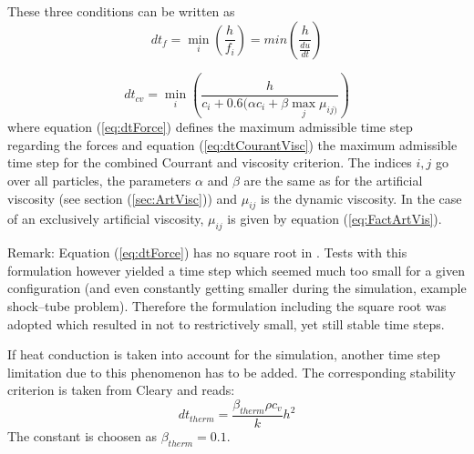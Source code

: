 \documentclass{report}
\begin{document}
These three conditions can be written as \cite{Monaghan1989,Monaghan1992}
\begin{equation}
\label{eq:dtForce}
 dt_f=\min_i\left(\frac{h}{f_i}\right)=min\left(\frac{h}{\frac{du}{dt}}\right)
\end{equation}

\begin{equation}
\label{eq:dtCourantVisc}
 dt_{cv}=\min_i\left(\frac{h}{c_i+0.6(\alpha c_i+\beta \max_j \mu_{ij)}}\right)
\end{equation}
where equation (\ref{eq:dtForce}) defines the maximum admissible time step regarding the forces and equation (\ref{eq:dtCourantVisc}) the maximum admissible time step for the combined Courrant and viscosity criterion. The indices $i,j$ go over all particles, the parameters $\alpha$ and $\beta$ are the same as for the artificial viscosity (see section (\ref{sec:ArtVisc})) and $\mu_{ij}$ is the dynamic viscosity. In the case of an exclusively artificial viscosity, $\mu_{ij}$ is given by equation (\ref{eq:FactArtVis}).

Remark: Equation (\ref{eq:dtForce}) has no square root in \cite{Monaghan1992}. Tests with this formulation however yielded a time step which seemed much too small for a given configuration (and even constantly getting smaller during the simulation, example shock--tube problem). Therefore the formulation including the square root \cite{Monaghan1989} was adopted which resulted in not to restrictively small, yet still stable time steps.

If  heat conduction is taken into account for the simulation, another time step limitation due to this phenomenon has to be added. The corresponding stability criterion is taken from Cleary \cite{Cleary1999} and reads:
\begin{equation}
 \label{eq:dt_limitation_thermal}
dt_\mathit{therm}=\frac{\beta_\mathit{therm}\rho c_v}{k} h^2
\end{equation}
The constant is choosen as $\beta_\mathit{therm}=0.1$.
\end{document}
